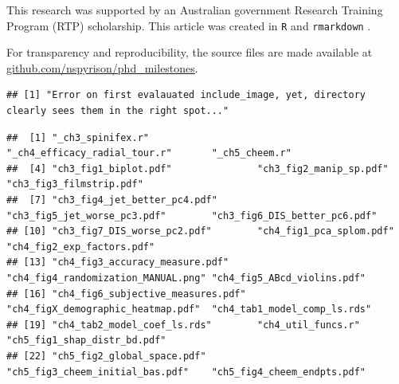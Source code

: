 \documentclass{template/monashthesis}
\begin{document}
This research was supported by an Australian government Research Training Program (RTP) scholarship. This article was created in \texttt{R} \autocite{r_core_team_r:_2020} and \texttt{rmarkdown} \autocite{xie_r_2018}.

For transparency and reproducibility, the source files are made available at \href{https://github.com/nspyrison/phd_milestones}{github.com/nspyrison/phd\_milestones}.

\begin{Shaded}
\begin{Highlighting}[]
\SpecialCharTok{::}\SpecialCharTok{$}\NormalTok{(}
   \NormalTok{)}

\end{Highlighting}
\end{Shaded}

\begin{verbatim}
## [1] "Error on first evalauated include_image, yet, directory clearly sees them in the right spot..."
\end{verbatim}

\begin{Shaded}
\begin{Highlighting}[]
\NormalTok{(}\NormalTok{)}
\end{Highlighting}
\end{Shaded}

\begin{verbatim}
##  [1] "_ch3_spinifex.r"                   "_ch4_efficacy_radial_tour.r"       "_ch5_cheem.r"                     
##  [4] "ch3_fig1_biplot.pdf"               "ch3_fig2_manip_sp.pdf"             "ch3_fig3_filmstrip.pdf"           
##  [7] "ch3_fig4_jet_better_pc4.pdf"       "ch3_fig5_jet_worse_pc3.pdf"        "ch3_fig6_DIS_better_pc6.pdf"      
## [10] "ch3_fig7_DIS_worse_pc2.pdf"        "ch4_fig1_pca_splom.pdf"            "ch4_fig2_exp_factors.pdf"         
## [13] "ch4_fig3_accuracy_measure.pdf"     "ch4_fig4_randomization_MANUAL.png" "ch4_fig5_ABcd_violins.pdf"        
## [16] "ch4_fig6_subjective_measures.pdf"  "ch4_figX_demographic_heatmap.pdf"  "ch4_tab1_model_comp_ls.rds"       
## [19] "ch4_tab2_model_coef_ls.rds"        "ch4_util_funcs.r"                  "ch5_fig1_shap_distr_bd.pdf"       
## [22] "ch5_fig2_global_space.pdf"         "ch5_fig3_cheem_initial_bas.pdf"    "ch5_fig4_cheem_endpts.pdf"
\end{verbatim}
\end{document}
